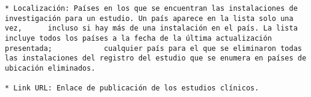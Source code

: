 \documentclass[
]{article}
\begin{document}
\begin{verbatim}
* Localización: Países en los que se encuentran las instalaciones de investigación para un estudio. Un país aparece en la lista solo una vez,      incluso si hay más de una instalación en el país. La lista incluye todos los países a la fecha de la última actualización presentada;            cualquier país para el que se eliminaron todas las instalaciones del registro del estudio que se enumera en países de ubicación eliminados.

* Link URL: Enlace de publicación de los estudios clínicos.
\end{verbatim}
\end{document}
